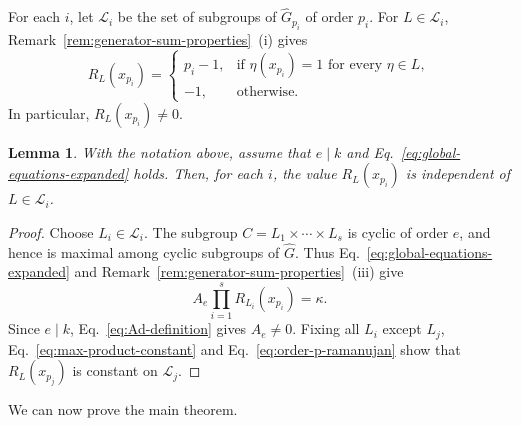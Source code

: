 \documentclass[11pt]{article}
\newtheorem{lemma}[theorem]{Lemma}
\theoremstyle{definition}
\newcommand{\cL}{\mathcal L}
\begin{document}
For each \(i\), let \(\cL_i\) be the set of subgroups of
\(\widehat G_{p_i}\) of order \(p_i\).  For \(L\in\cL_i\),
Remark~\ref{rem:generator-sum-properties}~(i) gives
\begin{equation}\label{eq:order-p-ramanujan}
	R_L(x_{p_i})=
	\begin{cases}
		p_i-1,
		&\text{if }\eta(x_{p_i})=1\text{ for every }\eta\in L,\\
		-1,
		&\text{otherwise}.
	\end{cases}
\end{equation}
In particular, \(R_L(x_{p_i})\ne 0\).

\begin{lemma}\label{lem:mixed-maximal-products}
	With the notation above, assume that \(e\mid k\) and
	Eq.~\eqref{eq:global-equations-expanded} holds.  Then, for each \(i\),
	the value \(R_L(x_{p_i})\) is independent of \(L\in\cL_i\).
\end{lemma}

\begin{proof}
	Choose \(L_i\in\cL_i\).  The subgroup
	\(C=L_1\times\cdots\times L_s\) is cyclic of order \(e\), and hence is
	maximal among cyclic subgroups of \(\widehat G\).  Thus
	Eq.~\eqref{eq:global-equations-expanded} and
	Remark~\ref{rem:generator-sum-properties}~(iii) give
	\begin{equation}\label{eq:max-product-constant}
		A_e\prod_{i=1}^s R_{L_i}(x_{p_i})=\kappa.
	\end{equation}
	Since \(e\mid k\), Eq.~\eqref{eq:Ad-definition} gives \(A_e\ne 0\).
	Fixing all \(L_i\) except \(L_j\), Eq.~\eqref{eq:max-product-constant}
	and Eq.~\eqref{eq:order-p-ramanujan} show that \(R_L(x_{p_j})\) is
	constant on \(\cL_j\).  
\end{proof}

We can now prove the main theorem.
\end{document}
